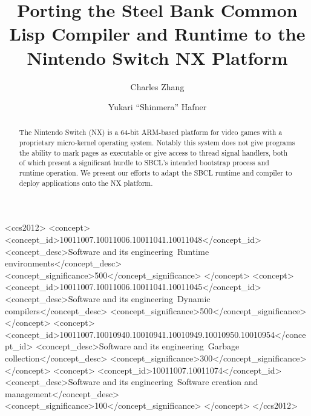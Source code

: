 \documentclass[format=sigconf]{acmart}
\begin{document}
\title{Porting the Steel Bank Common Lisp Compiler and Runtime to the Nintendo Switch NX Platform}

\author{Charles Zhang}
\author{Yukari ``Shinmera'' Hafner}

\begin{CCSXML}
<ccs2012>
   <concept>
       <concept_id>10011007.10011006.10011041.10011048</concept_id>
       <concept_desc>Software and its engineering~Runtime environments</concept_desc>
       <concept_significance>500</concept_significance>
       </concept>
   <concept>
       <concept_id>10011007.10011006.10011041.10011045</concept_id>
       <concept_desc>Software and its engineering~Dynamic compilers</concept_desc>
       <concept_significance>500</concept_significance>
       </concept>
   <concept>
       <concept_id>10011007.10010940.10010941.10010949.10010950.10010954</concept_id>
       <concept_desc>Software and its engineering~Garbage collection</concept_desc>
       <concept_significance>300</concept_significance>
       </concept>
   <concept>
       <concept_id>10011007.10011074</concept_id>
       <concept_desc>Software and its engineering~Software creation and management</concept_desc>
       <concept_significance>100</concept_significance>
       </concept>
 </ccs2012>
\end{CCSXML}


\begin{abstract}
  The Nintendo Switch (NX) is a 64-bit ARM-based platform for video games with a proprietary micro-kernel operating system. Notably this system does not give programs the ability to mark pages as executable or give access to thread signal handlers, both of which present a significant hurdle to SBCL's intended bootstrap process and runtime operation. We present our efforts to adapt the SBCL runtime and compiler to deploy applications onto the NX platform.
\end{abstract}


\maketitle
\end{document}
